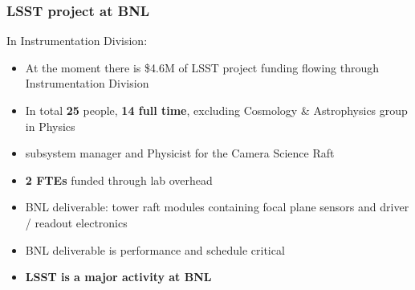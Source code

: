 \documentclass[aspectratio=169]{beamer}
\newcommand{\red}[1]{{\color{red}#1}}
\begin{document}
{
\frame
{
}
}



\begin{frame}
  \frametitle{LSST project at BNL}
  
  In Instrumentation Division:
  \begin{itemize}
  \item At the moment there is \$4.6M  of LSST project funding flowing
    through Instrumentation Division
  \item In total \textbf{25} people, \textbf{14 full time}, 
    excluding Cosmology \& Astrophysics group in Physics
  \item subsystem manager and Physicist for the Camera Science Raft
  \item \textbf{2 FTEs} funded through lab overhead
  \item BNL deliverable: tower raft modules containing focal plane
    sensors and driver / readout electronics
  \item BNL deliverable is performance and schedule critical
  \item \red{\textbf{LSST is a major activity at BNL}}

 \end{itemize}

\end{frame}
\end{document}
